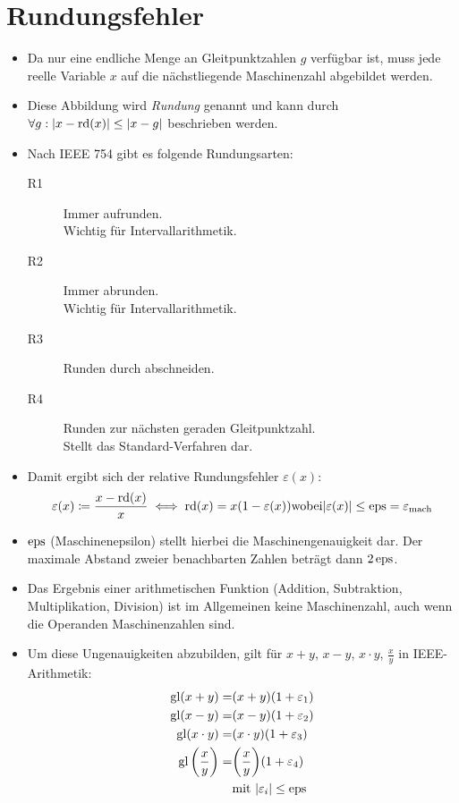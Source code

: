     \section{Rundungsfehler} %
        \begin{itemize}
        	\item Da nur eine endliche Menge an Gleitpunktzahlen \( g \) verfügbar ist, muss jede reelle Variable \( x \) auf die nächstliegende Maschinenzahl abgebildet werden.
        	\item Diese Abbildung wird \textit{Rundung} genannt und kann durch \( \forall g : \abs{x - \operatorname{rd}(x)} \leq \abs{x - g} \) beschrieben werden.
        	\item Nach IEEE 754 gibt es folgende Rundungsarten:
            	\begin{description}
            		\item[R1] Immer aufrunden. \\ Wichtig für Intervallarithmetik.
            		\item[R2] Immer abrunden. \\ Wichtig für Intervallarithmetik.
            		\item[R3] Runden durch abschneiden.
            		\item[R4] Runden zur nächsten geraden Gleitpunktzahl. \\ Stellt das Standard-Verfahren dar.
            	\end{description}
            \item Damit ergibt sich der relative Rundungsfehler \( \varepsilon(x) \):
	            \begin{equation*}
		            \varepsilon(x) \coloneqq \frac{x - \operatorname{rd}(x)}{x} \iff \operatorname{rd}(x) = x(1 - \varepsilon(x)) \text{wobei} \abs{\varepsilon(x)} \leq \operatorname{eps} = \varepsilon _ \text{mach}
	            \end{equation*}
	        \item \( \operatorname{eps} \) (Maschinenepsilon) stellt hierbei die Maschinengenauigkeit dar. Der maximale Abstand zweier benachbarten Zahlen beträgt dann \( 2\operatorname{eps} \).
	        \item Das Ergebnis einer arithmetischen Funktion (Addition, Subtraktion, Multiplikation, Division) ist im Allgemeinen keine Maschinenzahl, auch wenn die Operanden Maschinenzahlen sind.
	        \item Um diese Ungenauigkeiten abzubilden, gilt für \( x + y \), \( x - y \), \( x \cdot y \), \( \frac{x}{y} \) in IEEE-Arithmetik:
		        \begin{align*}
		        	\operatorname{gl}(x + y)                        = & (x + y)(1 + \varepsilon _ 1)                 \\
		        	\operatorname{gl}(x - y)                        = & (x - y)(1 + \varepsilon _ 2)                 \\
		        	\operatorname{gl}(x \cdot y)                    = & (x \cdot y)(1 + \varepsilon _ 3)             \\
		        	\operatorname{gl}\bigg(\frac{x}{y}\bigg)        = & \bigg(\frac{x}{y}\bigg)(1 + \varepsilon _ 4) \\
		        	                                    & \text{mit } \abs{\varepsilon _ i} \leq \operatorname{eps}
		        \end{align*}
        \end{itemize}
